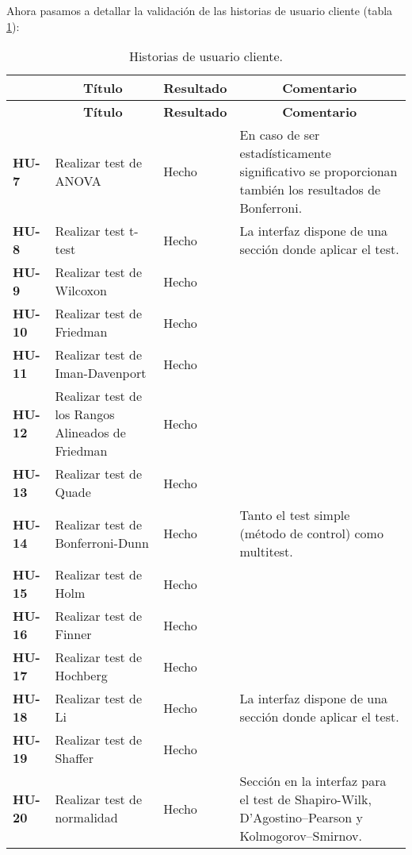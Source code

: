 Ahora pasamos a detallar la validación de las historias de usuario cliente (tabla \ref{validacionhuc}):

\begin{center}
\setlength{\belowcaptionskip}{0.5cm}
\begin{longtable}[H]{| p{2cm} | p{4.25cm} | p{1cm} | p{5cm} |}
	\hline
	\rowcolor{Gray}
	\multicolumn{1}{|c|}{\textbf{H. Usuario}} & \multicolumn{1}{|c|}{\textbf{Título}} & \multicolumn{1}{|c|}{\textbf{Resultado}} & \multicolumn{1}{|c|}{\textbf{Comentario}} \\ \hline
	\endfirsthead
	\hline
	\rowcolor{Gray}
	\multicolumn{1}{|c|}{\textbf{H. Usuario}} & \multicolumn{1}{|c|}{\textbf{Título}} & \multicolumn{1}{|c|}{\textbf{Resultado}} & \multicolumn{1}{|c|}{\textbf{Comentario}} \\ \hline
	\endhead
	\caption{Historias de usuario cliente.}
	\label{validacionhuc}
	\endfoot
	\textbf{HU-7} & Realizar test de ANOVA & Hecho & En caso de ser estadísticamente significativo se proporcionan también los resultados de Bonferroni. \\ \hline
	\textbf{HU-8} & Realizar test t-test & Hecho & La interfaz dispone de una sección donde aplicar el test. \\ \hline
	\textbf{HU-9} & Realizar test de Wilcoxon & Hecho & \\ \hline
	\textbf{HU-10} & Realizar test de Friedman & Hecho & \\ \hline
	\textbf{HU-11} & Realizar test de Iman-Davenport & Hecho & \\ \hline
	\textbf{HU-12} & Realizar test de los Rangos Alineados de Friedman & Hecho & \\ \hline
	\textbf{HU-13} & Realizar test de Quade & Hecho & \\ \hline
	\textbf{HU-14} & Realizar test de Bonferroni-Dunn & Hecho & Tanto el test simple (método de control) como multitest. \\ \hline
	\textbf{HU-15} & Realizar test de Holm & Hecho & \\ \hline
	\textbf{HU-16} & Realizar test de Finner & Hecho & \\ \hline
	\textbf{HU-17} & Realizar test de Hochberg & Hecho & \\ \hline
	\textbf{HU-18} & Realizar test de Li & Hecho & La interfaz dispone de una sección donde aplicar el test. \\ \hline
	\textbf{HU-19} & Realizar test de Shaffer & Hecho & \\ \hline
	\textbf{HU-20} & Realizar test de normalidad & Hecho & Sección en la interfaz para el test de Shapiro-Wilk, D’Agostino–Pearson y Kolmogorov–Smirnov. \\ \hline

\end{longtable}
\end{center}

